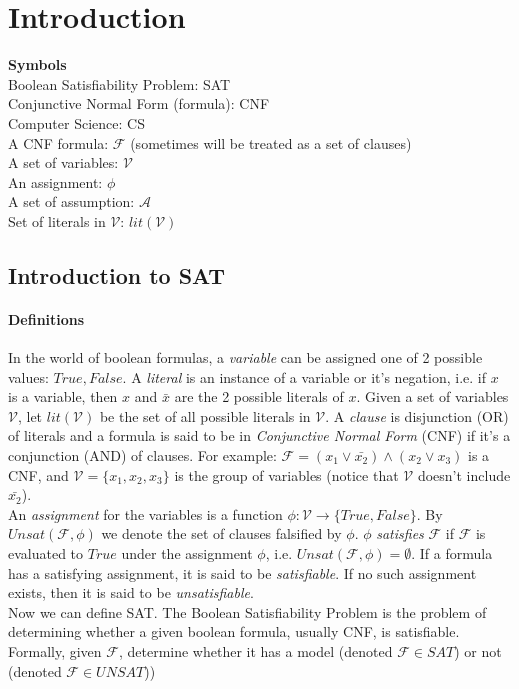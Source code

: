 \documentclass[]{article}
\begin{document}
	\pagebreak
	\tableofcontents
	\pagebreak
	
	\section{Introduction}
	\textbf{Symbols} \\
	Boolean Satisfiability Problem: SAT \\
	Conjunctive Normal Form (formula): CNF \\
	Computer Science: CS \\
	A CNF formula: $ \mathcal{F} $ (sometimes will be treated as a set of clauses) \\
	A set of variables: $ \mathcal{V} $ \\
	An assignment: $ \phi $ \\
	A set of assumption: $ \mathcal{A} $ \\
	Set of literals in $ \mathcal{V} $: $ lit(\mathcal{V}) $
	\subsection{Introduction to SAT}
	\paragraph{Definitions}
	In the world of boolean formulas, a \textit{variable} can be assigned one of 2 possible values: $ True, False $. A \textit{literal} is an instance of a variable or it's negation, i.e. if $ x $ is a variable, then $ x $ and $ \bar{x} $ are the 2 possible literals of $ x $. Given a set of variables $ \mathcal{V} $, let $ lit(\mathcal{V}) $ be the set of all possible literals in $ \mathcal{V} $. A \textit{clause} is disjunction (OR) of literals and a formula is said to be in \textit{Conjunctive Normal Form} (CNF) if it's a conjunction (AND) of clauses. For example: $\mathcal{F} = (x_1 \lor \bar{x_2}) \land (x_2 \lor x_3) $ is a CNF, and $ \mathcal{V}=\{x_1,x_2,x_3\} $ is the group of variables (notice that $ \mathcal{V} $ doesn't include $ \bar{x_2} $). \\ An \textit{assignment} for the variables is a function $ \phi : \mathcal{V} \rightarrow \{True, False\} $.  By $ Unsat(\mathcal{F},\phi) $ we denote the set of clauses falsified by $ \phi $. $ \phi $ \textit{satisfies} $ \mathcal{F} $ if $ \mathcal{F} $ is evaluated to $ True $ under the assignment $ \phi $, i.e. $ Unsat(\mathcal{F},\phi) = \emptyset $. If a formula has a satisfying assignment, it is said to be \textit{satisfiable}. If no such assignment exists, then it is said to be \textit{unsatisfiable}. \\
	Now we can define SAT. The Boolean Satisfiability Problem is the problem of determining whether a given boolean formula, usually CNF, is satisfiable. Formally, given $ \mathcal{F} $, determine whether it has a model (denoted $ \mathcal{F} \in SAT $) or not (denoted $ \mathcal{F} \in UNSAT $))
\end{document}
